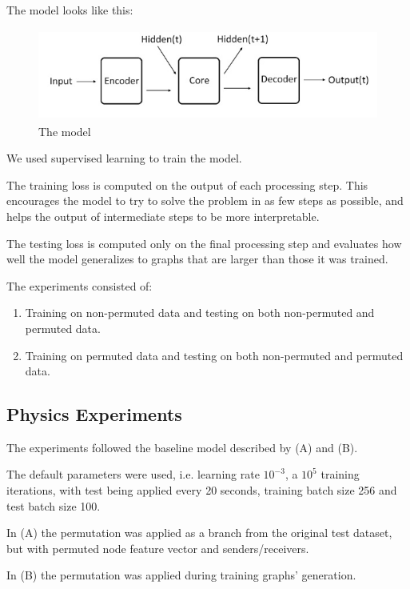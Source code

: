 The model looks like this:

\begin{figure}[!htb]
    \centering
    \includegraphics[height=3.0cm]{fig/content/model/model.jpg}
    \caption{The model}
\end{figure}

We used supervised learning to train the model. 

The training loss is computed on the output of each processing step. This encourages the model to try to solve the problem in as few steps as possible, and helps the output of intermediate steps to be more interpretable.

The testing loss is computed only on the final processing step and evaluates how well the model generalizes to graphs that are larger than those it was trained.

The experiments consisted of:

\begin{enumerate}[label=(\Alph*)]

    \item Training on non-permuted data and testing on both non-permuted  and permuted data.
    
    \item Training on permuted data and testing on both non-permuted and permuted data.

\end{enumerate}

\subsection{Physics Experiments}

The experiments followed the baseline model described by (A) and (B).

The default parameters were used, i.e. learning rate $10^{-3}$, a $10^5$ training iterations, with test being applied every 20 seconds, training batch size 256 and test batch size 100.

In (A) the permutation was applied as a branch from the original test dataset, but with permuted node feature vector and senders/receivers.

In (B) the permutation was applied during training graphs’ generation.

